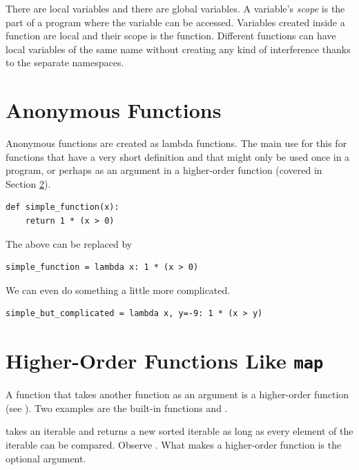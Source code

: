 There are local variables and there are global variables. A variable's \emph{scope} is the part of a program where the variable can be accessed. Variables created inside a function are local and their scope is the function. Different functions can have local variables of the same name without creating any kind of interference thanks to the separate namespaces.
 
 
\section{Anonymous Functions}

Anonymous functions are created as lambda functions. The main use for this for functions that have a very short definition and that might only be used once in a program, or perhaps as an argument in a higher-order function (covered in Section \ref{sec:higher}).

\begin{lstlisting}
def simple_function(x):
    return 1 * (x > 0)
\end{lstlisting}

The above can be replaced by 
\begin{lstlisting}
simple_function = lambda x: 1 * (x > 0)
\end{lstlisting}

We can even do something a little more complicated. 

\begin{lstlisting}
simple_but_complicated = lambda x, y=-9: 1 * (x > y)
\end{lstlisting}%

 
\section{Higher-Order Functions Like \texttt{map}}\label{sec:higher}
 
A function that takes another function as an argument is a higher-order function (see \cite{ramalho2015fluent}). Two examples are the built-in functions  and .

 takes an iterable and returns a new sorted iterable as long as every element of the iterable can be compared. Observe . What makes  a higher-order function is the optional  argument. 

